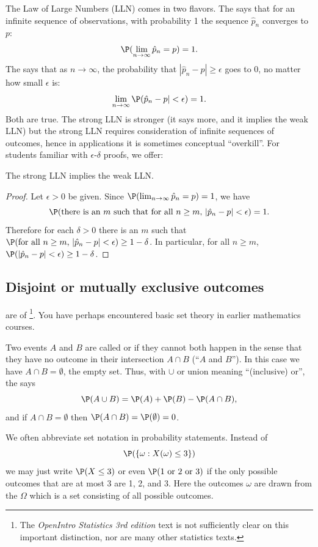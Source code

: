 	The Law of Large Numbers (LLN) comes in two flavors. The  says that for an infinite sequence of observations, with probability 1 the sequence $\hat p_n$ converges to $p$:
	\[
		\P(\lim_{n\to\infty}\hat p_n = p) = 1.
	\]
	The  says that as $n\to\infty$, the probability that $|\hat p_n-p|\ge\epsilon$ goes to 0, no matter how small $\epsilon$ is:
	\[
		\lim_{n\to\infty}\P(\hat p_n-p|<\epsilon) = 1.
	\]
	Both are true. The strong LLN is stronger (it says more, and it implies the weak LLN) but the strong LLN requires consideration of infinite sequences of outcomes, hence in applications it is sometimes conceptual ``overkill''.
	For students familiar with $\epsilon$-$\delta$ proofs, we offer:
	\begin{thm}
	The strong LLN implies the weak LLN.
	\end{thm}
	\begin{proof}
	Let $\epsilon>0$ be given. Since $\P(\lim_{n\to\infty}\hat p_n = p) = 1$,
	we have
	\[
		\P(\text{there is an $m$ such that for all $n\ge m$, $|\hat p_n-p|<\epsilon$})=1.
	\]
	Therefore for each $\delta>0$ there is an $m$ such that
	$\P(\text{for all $n\ge m$, $|\hat p_n-p|<\epsilon$})\ge 1-\delta$. In particular, for all $n\ge m$, $\P(|\hat p_n-p|<\epsilon)\ge 1-\delta$.
	\end{proof}


\subsection{Disjoint or mutually exclusive outcomes}

	 are  of \footnote{The \emph{OpenIntro Statistics 3rd edition} text is not sufficiently clear on this important distinction, nor are many other statistics texts.}. You have perhaps encountered basic set theory in earlier mathematics courses.

	Two events $A$ and $B$ are called  or  if they cannot both happen in the sense that they have no outcome in their intersection $A\cap B$ (``$A$ and $B$'').
	In this case we have $A\cap B=\emptyset$, the empty set. Thus, with $\cup$ or union meaning ``(inclusive) or'', the  says
	\[
		\P(A\cup B) = \P(A) + \P(B) - \P(A\cap B),
	\]
	and if $A\cap B=\emptyset$ then $\P(A\cap B)=\P(\emptyset)=0$.

	We often abbreviate set notation in probability statements. Instead of
	\[
		\P(\{\omega: X(\omega)\le 3\})
	\]
	we may just write $\P(X\le 3)$ or even $\P(1\text{ or }2\text{ or }3)$ if the only possible outcomes that are at most 3 are 1, 2, and 3.
	Here the outcomes $\omega$ are drawn from the  $\Omega$ which is a set consisting of all possible outcomes.

